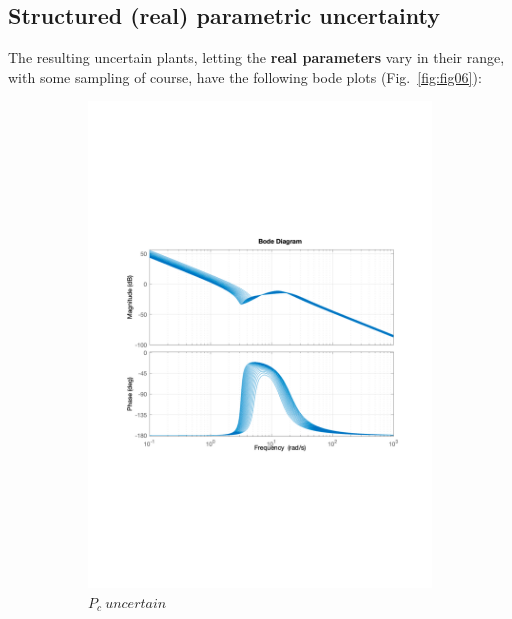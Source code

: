 \documentclass[a4paper, 12pt]{article}
\begin{document}
\subsection{Structured (real) parametric uncertainty}
The resulting uncertain plants, letting the \textbf{real parameters} vary in their range, with some sampling of course, have the following bode plots (Fig.~\ref{fig:fig06}):
\begin{figure}[h!]
    \centering
    \begin{subfigure}[b]{0.45\textwidth}
        \includegraphics[width=\textwidth]
        {Figures/fig06a.pdf}
            \caption{$P_c\ uncertain$}
        \label{fig:fig06a}
    \end{subfigure}
    \begin{subfigure}[b]{0.45\textwidth}

\end{subfigure}
\end{figure}
\end{document}
